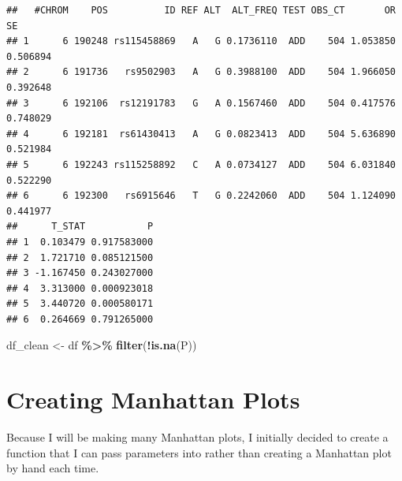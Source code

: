 \documentclass[
  12pt,
]{article}
\newenvironment{Shaded}{\begin{snugshade}}{\end{snugshade}}
\newcommand{\FunctionTok}[1]{\textcolor[rgb]{0.13,0.29,0.53}{\textbf{#1}}}
\newcommand{\NormalTok}[1]{#1}
\newcommand{\OtherTok}[1]{\textcolor[rgb]{0.56,0.35,0.01}{#1}}
\newcommand{\SpecialCharTok}[1]{\textcolor[rgb]{0.81,0.36,0.00}{\textbf{#1}}}
\begin{document}
\begin{verbatim}
##   #CHROM    POS          ID REF ALT  ALT_FREQ TEST OBS_CT       OR       SE
## 1      6 190248 rs115458869   A   G 0.1736110  ADD    504 1.053850 0.506894
## 2      6 191736   rs9502903   A   G 0.3988100  ADD    504 1.966050 0.392648
## 3      6 192106  rs12191783   G   A 0.1567460  ADD    504 0.417576 0.748029
## 4      6 192181  rs61430413   A   G 0.0823413  ADD    504 5.636890 0.521984
## 5      6 192243 rs115258892   C   A 0.0734127  ADD    504 6.031840 0.522290
## 6      6 192300   rs6915646   T   G 0.2242060  ADD    504 1.124090 0.441977
##      T_STAT           P
## 1  0.103479 0.917583000
## 2  1.721710 0.085121500
## 3 -1.167450 0.243027000
## 4  3.313000 0.000923018
## 5  3.440720 0.000580171
## 6  0.264669 0.791265000
\end{verbatim}

\begin{Shaded}
\begin{Highlighting}[]
\NormalTok{df\_clean }\OtherTok{\textless{}{-}}\NormalTok{ df }\SpecialCharTok{\%\textgreater{}\%}
  \FunctionTok{filter}\NormalTok{(}\SpecialCharTok{!}\FunctionTok{is.na}\NormalTok{(P))}
\end{Highlighting}
\end{Shaded}

\section{Creating Manhattan Plots}\label{creating-manhattan-plots}

Because I will be making many Manhattan plots, I initially decided to
create a function that I can pass parameters into rather than creating a
Manhattan plot by hand each time.
\end{document}
